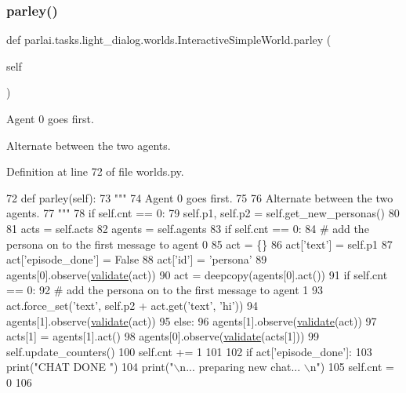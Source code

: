\subsubsection{\texorpdfstring{parley()}{parley()}}
{\footnotesize\ttfamily def parlai.\+tasks.\+light\+\_\+dialog.\+worlds.\+Interactive\+Simple\+World.\+parley (\begin{DoxyParamCaption}\item[{}]{self }\end{DoxyParamCaption})}

\begin{DoxyVerb}Agent 0 goes first.

Alternate between the two agents.
\end{DoxyVerb}
 

Definition at line 72 of file worlds.\+py.


\begin{DoxyCode}
72     \textcolor{keyword}{def }parley(self):
73         \textcolor{stringliteral}{"""}
74 \textcolor{stringliteral}{        Agent 0 goes first.}
75 \textcolor{stringliteral}{}
76 \textcolor{stringliteral}{        Alternate between the two agents.}
77 \textcolor{stringliteral}{        """}
78         \textcolor{keywordflow}{if} self.cnt == 0:
79             self.p1, self.p2 = self.get\_new\_personas()
80 
81         acts = self.acts
82         agents = self.agents
83         \textcolor{keywordflow}{if} self.cnt == 0:
84             \textcolor{comment}{# add the persona on to the first message to agent 0}
85             act = \{\}
86             act[\textcolor{stringliteral}{'text'}] = self.p1
87             act[\textcolor{stringliteral}{'episode\_done'}] = \textcolor{keyword}{False}
88             act[\textcolor{stringliteral}{'id'}] = \textcolor{stringliteral}{'persona'}
89             agents[0].observe(\hyperlink{namespaceparlai_1_1core_1_1worlds_afc3fad603b7bce41dbdc9cdc04a9c794}{validate}(act))
90         act = deepcopy(agents[0].act())
91         \textcolor{keywordflow}{if} self.cnt == 0:
92             \textcolor{comment}{# add the persona on to the first message to agent 1}
93             act.force\_set(\textcolor{stringliteral}{'text'}, self.p2 + act.get(\textcolor{stringliteral}{'text'}, \textcolor{stringliteral}{'hi'}))
94             agents[1].observe(\hyperlink{namespaceparlai_1_1core_1_1worlds_afc3fad603b7bce41dbdc9cdc04a9c794}{validate}(act))
95         \textcolor{keywordflow}{else}:
96             agents[1].observe(\hyperlink{namespaceparlai_1_1core_1_1worlds_afc3fad603b7bce41dbdc9cdc04a9c794}{validate}(act))
97         acts[1] = agents[1].act()
98         agents[0].observe(\hyperlink{namespaceparlai_1_1core_1_1worlds_afc3fad603b7bce41dbdc9cdc04a9c794}{validate}(acts[1]))
99         self.update\_counters()
100         self.cnt += 1
101 
102         \textcolor{keywordflow}{if} act[\textcolor{stringliteral}{'episode\_done'}]:
103             print(\textcolor{stringliteral}{"CHAT DONE "})
104             print(\textcolor{stringliteral}{"\(\backslash\)n... preparing new chat... \(\backslash\)n"})
105             self.cnt = 0
106 \end{DoxyCode}


